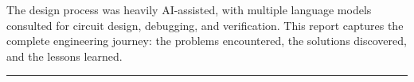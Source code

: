 The design process was heavily AI-assisted, with multiple
language models consulted for circuit design, debugging, and verification.
This report captures the complete engineering journey: the problems
encountered, the solutions discovered, and the lessons learned.

\newpage
\thispagestyle{fancy}
{\headingfont\color{brandteal}
  \renewcommand{\contentsname}{Contents}
  \tableofcontents}
\vspace{0.5cm}
\noindent\color{rulegray}\rule{\linewidth}{0.3pt}

\newpage
